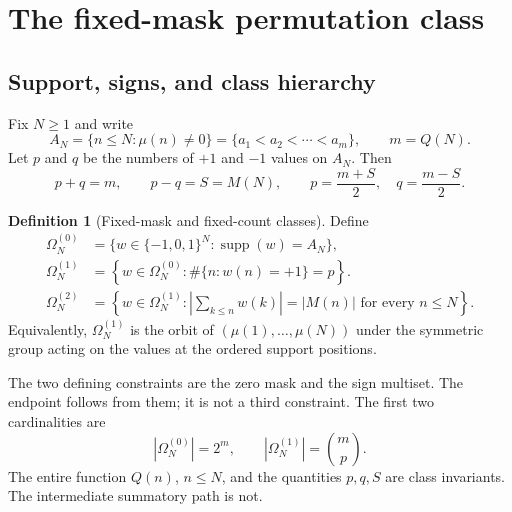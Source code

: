 \documentclass[11pt,reqno]{amsart}
\numberwithin{equation}{section}
\theoremstyle{plain}
\theoremstyle{definition}
\newtheorem{definition}[theorem]{Definition}
\theoremstyle{remark}
\newcommand{\supp}{\operatorname{supp}}
\newcommand{\Om}{\Omega}
\begin{document}
\section{The fixed-mask permutation class}
\label{sec:fixed-mask-class}

\subsection{Support, signs, and class hierarchy}
\label{subsec:support-class}

Fix \(N\geq1\) and write
\begin{equation}
A_N=\{n\leq N:\mu(n)\neq0\}
=\{a_1<a_2<\cdots<a_m\},\qquad m=Q(N).
\label{eq:squarefree-support}
\end{equation}
Let \(p\) and \(q\) be the numbers of \(+1\) and \(-1\) values on \(A_N\).
Then
\begin{equation}
p+q=m,\qquad p-q=S=M(N),\qquad
p=\frac{m+S}{2},\quad q=\frac{m-S}{2}.
\label{eq:sign-counts-endpoint}
\end{equation}

\begin{definition}[Fixed-mask and fixed-count classes]
\label{def:permutation-classes}
Define
\begin{align}
\Om_N^{(0)}
&=\{w\in\{-1,0,1\}^N:\supp(w)=A_N\},
\label{eq:omega-zero}\\
\Om_N^{(1)}
&=\left\{w\in\Om_N^{(0)}:
\#\{n:w(n)=+1\}=p\right\}.
\label{eq:omega-one}\\
\Om_N^{(2)}
&=\left\{w\in\Om_N^{(1)}:
\left|\sum_{k\leq n}w(k)\right|=|M(n)|
\text{ for every }n\leq N\right\}.
\label{eq:omega-two}
\end{align}
Equivalently, \(\Om_N^{(1)}\) is the orbit of
\((\mu(1),\ldots,\mu(N))\) under the symmetric group acting on the values at
the ordered support positions.
\end{definition}

The two defining constraints are the zero mask and the sign multiset.  The
endpoint follows from them; it is not a third constraint.  The first two
cardinalities are
\begin{equation}
|\Om_N^{(0)}|=2^m,\qquad
|\Om_N^{(1)}|=\binom{m}{p}.
\label{eq:class-cardinalities}
\end{equation}
The entire function \(Q(n)\), \(n\leq N\), and the quantities \(p,q,S\) are
class invariants.  The intermediate summatory path is not.
\end{document}

